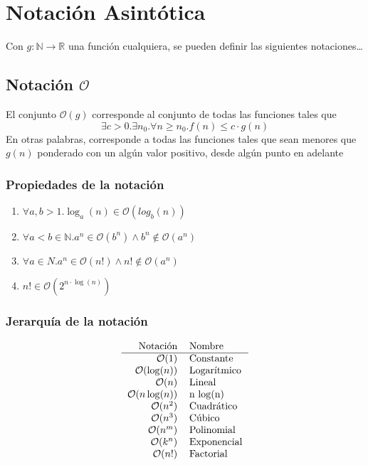 \documentclass[../main.tex]{subfiles}
\begin{document}
\section{Notación Asintótica}
Con $g: \mathds{N} \rightarrow \mathds{R}$ una función cualquiera, se pueden definir las siguientes notaciones\dots
\subsection{Notación $\mathcal{O}$}
El conjunto $\mathcal{O}(g)$ corresponde al conjunto de todas las funciones tales que
\[ \exists c > 0 . \exists n_0 . \forall n \geq n_0 . f(n) \leq c \cdot g(n) \]
En otras palabras, corresponde a todas las funciones tales que sean menores que $g(n)$ ponderado con un algún valor positivo, desde algún punto en adelante

\subsubsection{Propiedades de la notación}
\begin{enumerate}
    \item $\forall a,b > 1 . \log_a(n) \in \mathcal{O}(log_b(n))$
    \item $\forall a < b \in \mathds{N} . a^n \in \mathcal{O}(b^n) \wedge b^n \not\in \mathcal{O}(a^n)$
    \item $\forall a \in N . a^n \in \mathcal{O}(n!) \wedge n! \not\in \mathcal{O}(a^n)$
    \item $n! \in \mathcal{O}(2^{n \cdot \log(n)})$
\end{enumerate}
\subsubsection{Jerarquía de la notación}
\[
    \begin{tabular}{rl}
        Notación & Nombre \\ \hline
        $\mathcal{O}(1)$         & Constante \\
        $\mathcal{O}(\log(n))$   & Logarítmico \\
        $\mathcal{O}(n)$         & Lineal \\
        $\mathcal{O}(n \log(n))$ & n $\log$(n) \\
        $\mathcal{O}(n^2)$       & Cuadrático \\
        $\mathcal{O}(n^3)$       & Cúbico \\
        $\mathcal{O}(n^m)$       & Polinomial \\
        $\mathcal{O}(k^n)$       & Exponencial \\
        $\mathcal{O}(n!)$        & Factorial \\
        
    \end{tabular}
\]
\end{document}
